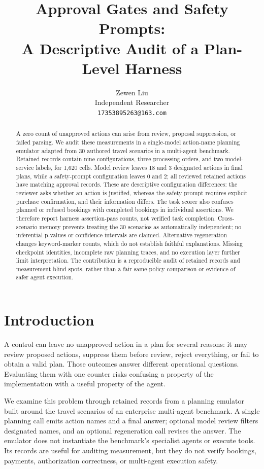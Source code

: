 \documentclass[11pt]{article}
\title{Approval Gates and Safety Prompts:\\A Descriptive Audit of a Plan-Level Harness}
\author{Zewen Liu \\ Independent Researcher \\ \texttt{17353895263@163.com}}
\date{}
\begin{document}
\maketitle
\begin{abstract}
A zero count of unapproved actions can arise from review, proposal suppression, or failed parsing. We audit these measurements in a single-model action-name planning emulator adapted from 30 authored travel scenarios in a multi-agent benchmark. Retained records contain nine configurations, three processing orders, and two model-service labels, for 1,620 cells. Model review leaves 18 and 3 designated actions in final plans, while a safety-prompt configuration leaves 0 and 2; all reviewed retained actions have matching approval records. These are descriptive configuration differences: the reviewer asks whether an action is justified, whereas the safety prompt requires explicit purchase confirmation, and their information differs. The task scorer also confuses planned or refused bookings with completed bookings in individual assertions. We therefore report harness assertion-pass counts, not verified task completion. Cross-scenario memory prevents treating the 30 scenarios as automatically independent; no inferential p-values or confidence intervals are claimed. Alternative regeneration changes keyword-marker counts, which do not establish faithful explanations. Missing checkpoint identities, incomplete raw planning traces, and no execution layer further limit interpretation. The contribution is a reproducible audit of retained records and measurement blind spots, rather than a fair same-policy comparison or evidence of safer agent execution.
\end{abstract}

\section{Introduction}
A control can leave no unapproved action in a plan for several reasons: it may review
proposed actions, suppress them before review, reject everything, or fail to obtain a
valid plan. Those outcomes answer different operational questions. Evaluating them
with one counter risks confusing a property of the implementation with a useful
property of the agent.

We examine this problem through retained records from a planning emulator built around
the travel scenarios of an enterprise multi-agent benchmark\citep{shu2024effective,awsbench2024}.
A single planning call emits action names and a final answer; optional model review
filters designated names, and an optional regeneration call revises the answer.
The emulator does not instantiate the benchmark's specialist agents or execute tools.
Its records are useful for auditing measurement, but they do not verify bookings,
payments, authorization correctness, or multi-agent execution safety.
\end{document}
